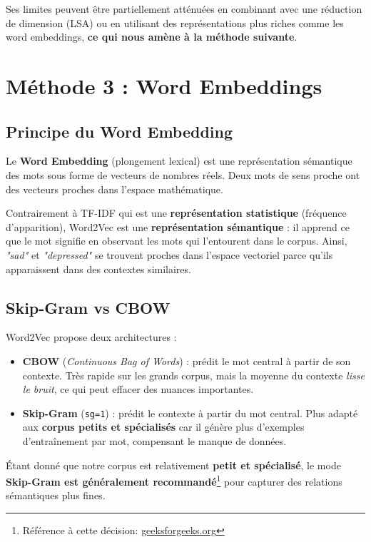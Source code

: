 \documentclass[12pt,a4paper]{report}
\begin{document}
Ses limites peuvent être partiellement atténuées en combinant avec une réduction de dimension (LSA) ou en utilisant des représentations plus riches comme les word embeddings, \textbf{ce qui nous amène à la méthode suivante}.

\pagebreak

\section{Méthode 3 : Word Embeddings}

\subsection{Principe du Word Embedding}

Le \textbf{Word Embedding} (plongement lexical) est une représentation sémantique des mots
sous forme de vecteurs de nombres réels. Deux mots de sens proche ont des vecteurs proches
dans l'espace mathématique.

Contrairement à TF-IDF qui est une \textbf{représentation statistique} (fréquence d'apparition),
Word2Vec est une \textbf{représentation sémantique} : il apprend ce que le mot signifie en
observant les mots qui l'entourent dans le corpus. Ainsi, \textit{"sad"} et \textit{"depressed"}
se trouvent proches dans l'espace vectoriel parce qu'ils apparaissent dans des contextes
similaires.

\subsection{Skip-Gram vs CBOW}

Word2Vec propose deux architectures :
\begin{itemize}
  \item \textbf{CBOW} (\textit{Continuous Bag of Words}) : prédit le mot central à partir de
        son contexte. Très rapide sur les grands corpus, mais la moyenne du contexte
        \textit{lisse le bruit}, ce qui peut effacer des nuances importantes.
  \item \textbf{Skip-Gram} (\texttt{sg=1}) : prédit le contexte à partir du mot central.
        Plus adapté aux \textbf{corpus petits et spécialisés} car il génère plus d'exemples
        d'entraînement par mot, compensant le manque de données.
\end{itemize}

\begin{note}[Remarque]
  Étant donné que notre corpus est relativement \textbf{petit et spécialisé}, le mode \textbf{Skip-Gram est généralement recommandé}\footnote{Référence à cette décision: \href{https://www.geeksforgeeks.org/nlp/word-embeddings-in-nlp-comparison-between-cbow-and-skip-gram-models/}{geeksforgeeks.org}} 
  pour capturer des relations sémantiques plus fines.
\end{note}
\end{document}
